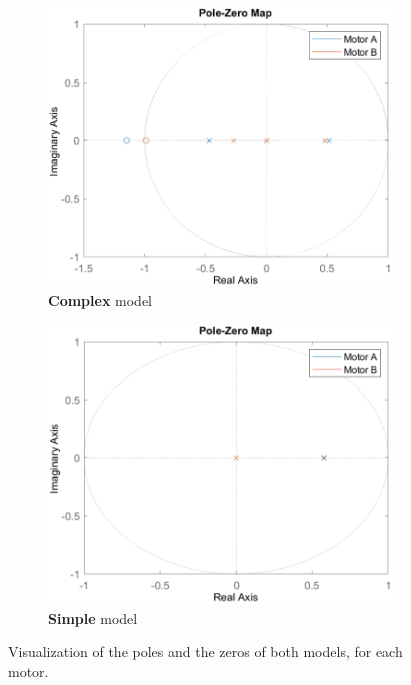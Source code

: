 \documentclass[a4paper,kul]{kulakarticle} %
\begin{document}
\begin{figure}[htp!]
	\centering
	\begin{subfigure}[b]{0.48\textwidth}
		\centering
		\includegraphics[width=\textwidth]{p&z_complex_cropped.pdf}
		\caption{\textbf{Complex} model}
	\end{subfigure}
	\hfill
	\begin{subfigure}[b]{0.48\textwidth}  
		\centering 
		\includegraphics[width=\textwidth]{p&z_simple_cropped.pdf}
		\caption{\textbf{Simple} model}
		\label{fig:pz_simple}
	\end{subfigure}
	\caption{Visualization of the poles and the zeros of both models, for each motor.} 
	\label{fig:pz}
\end{figure}
\end{document}
